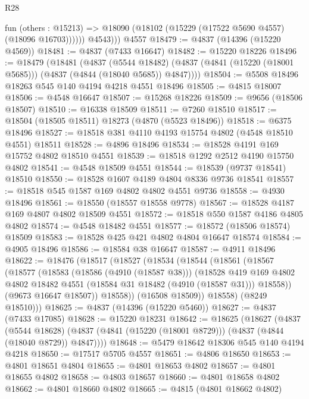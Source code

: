 \begin{lexlean}{R28}
\begin{coremodule}
            fun (others : @15213) =>
            @18090 (@18102 (@15229 (@17522 @5690 @4557) (@18096 @16703))))))
          @4543)))
    @4557
@18479 := @4837 (@14396 (@15220 @4569))
@18481 := @4837 (@7433 @16647)
@18482 := @15220 @18226
@18496 := @18479
    (@18481
      (@4837
        (@5544 @18482)
        (@4837 (@4841 (@15220 (@18001 @5685))) (@4837 (@4844 (@18040 @5685)) @4847))))
@18504 := @5508 @18496 @18263 @545 @140 @4194 @4218 @4551 @18496
@18505 := @4815 @18007
@18506 := @4548 @16647
@18507 := @15268 @18226
@18509 := @9656 (@18506 @18507)
@18510 := @16338 @18509
@18511 := @7260 @18510
@18517 := @18504 (@18505 @18511) @18273 (@4870 (@5523 @18496))
@18518 := @6375 @18496
@18527 := @18518 @381 @4110 @4193 @15754 @4802 (@4548 @18510 @4551) @18511
@18528 := @4896 @18496
@18534 := @18528 @4191 @169 @15752 @4802 @18510 @4551
@18539 := @18518 @1292 @2512 @4190 @15750 @4802
@18541 := @4548 @18509 @4551
@18544 := @18539 (@9737 @18541) @18510
@18550 := @18528 @1607 @4189 @4804 @8336 @9736 @18541
@18557 := @18518 @545 @1587 @169 @4802 @4802 @4551 @9736
@18558 := @4930 @18496
@18561 := @18550 (@18557 @18558 @9778)
@18567 := @18528 @4187 @169 @4807 @4802 @18509 @4551
@18572 := @18518 @550 @1587 @4186 @4805 @4802
@18574 := @4548 @18482 @4551
@18577 := @18572 (@18506 @18574) @18509
@18583 := @18528 @425 @421 @4802 @4804 @16647 @18574
@18584 := @4905 @18496
@18586 := @18584 @38 @16647
@18587 := @4911 @18496
@18622 := @18476
    (@18517
      (@18527
        (@18534
          (@18544
            (@18561
              (@18567
                (@18577
                  (@18583
                    (@18586 (@4910 (@18587 @38)))
                    (@18528
                      @419
                      @169
                      @4802
                      @4802
                      @18482
                      @4551
                      (@18584 @31 @18482 (@4910 (@18587 @31)))
                      @18558))
                  (@9673 @16647 @18507))
                @18558))
            (@16508 @18509))
          @18558)
        (@8249 @18510)))
@18625 := @4837 (@14396 (@15220 @5460))
@18627 := @4837 (@7433 @17085)
@18628 := @15220 @18231
@18642 := @18625
    (@18627
      (@4837
        (@5544 @18628)
        (@4837 (@4841 (@15220 (@18001 @8729))) (@4837 (@4844 (@18040 @8729)) @4847))))
@18648 := @5479 @18642 @18306 @545 @140 @4194 @4218
@18650 := @17517 @5705 @4557
@18651 := @4806 @18650
@18653 := @4801 @18651 @4804
@18655 := @4801 @18653 @4802
@18657 := @4801 @18655 @4802
@18658 := @4803 @18657
@18660 := @4801 @18658 @4802
@18662 := @4801 @18660 @4802
@18665 := @4815 (@4801 @18662 @4802)

\end{coremodule}
\end{lexlean}
